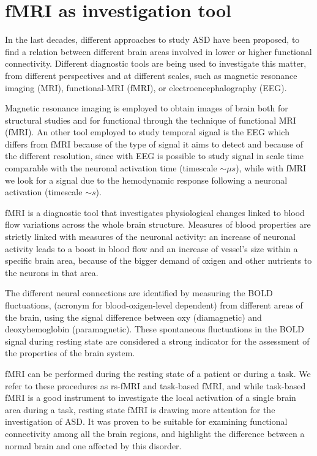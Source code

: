 \documentclass[11pt]{report}
\begin{document}
\section{fMRI as investigation tool}

In the last decades, different approaches to study ASD have been proposed, to find a relation between different brain areas involved in lower or higher functional connectivity.
Different diagnostic tools are being used to investigate this matter, from different perspectives and at different scales, such as magnetic resonance imaging (MRI), functional-MRI (fMRI), or electroencephalography (EEG).

Magnetic resonance imaging is employed to obtain images of brain both for structural studies and for functional through the  technique of functional MRI (fMRI).
An other tool employed to study temporal signal is the EEG which differs from fMRI because of the type of signal it aims to detect and because of the different resolution, since with EEG is possible to study signal in scale time comparable with the neuronal activation time (timescale $\sim \mu s$), while with fMRI we look for a signal due to the hemodynamic response following a neuronal activation (timescale $\sim s$).


fMRI is a diagnostic tool that investigates physiological changes linked to blood flow variations across the whole brain structure.
Measures of blood properties are strictly linked with measures of the neuronal activity: an increase of neuronal activity leads to a boost in blood flow and an increase of vessel's size within a specific brain area, because of the bigger demand of oxigen and other nutrients to the neurons in that area.

The different neural connections are identified by measuring the BOLD fluctuations, (acronym for blood-oxigen-level dependent) from different areas of the brain, using the signal difference between oxy (diamagnetic) and deoxyhemoglobin (paramagnetic).
These spontaneous fluctuations in the BOLD signal during resting state are considered a strong indicator for the assessment of the properties of the brain system.

fMRI can be performed during the resting state of a patient or during a task.
We refer to these procedures as rs-fMRI and task-based fMRI, and while task-based fMRI is a good instrument to investigate the local activation of a single brain area during a task, resting state fMRI is drawing more attention for the investigation of ASD.
It was proven to be suitable for examining functional connectivity among all the brain regions, and highlight the difference between a normal brain and one affected by this disorder.
\end{document}
